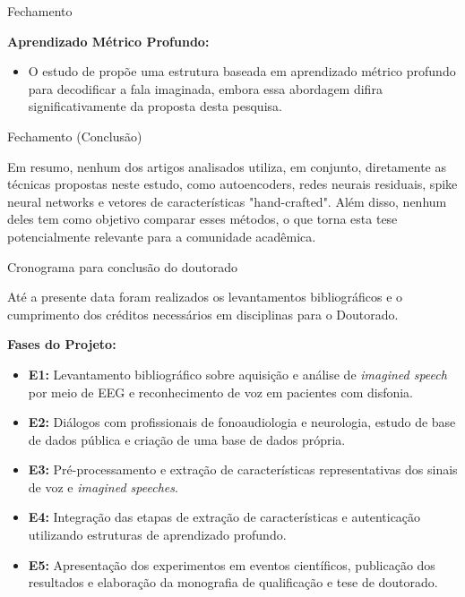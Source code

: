 \documentclass[aspectratio=169]{beamer}
\begin{document}
\begin{frame}[allowframebreaks]{Fechamento}
		\par \textbf{Aprendizado Métrico Profundo:}
		\begin{itemize}
			\item O estudo de \cite{lee2021decoding} propõe uma estrutura baseada em aprendizado métrico profundo para decodificar a fala imaginada, embora essa abordagem difira significativamente da proposta desta pesquisa.
		\end{itemize}
	\end{frame}
	\begin{frame}{Fechamento (Conclusão)}
		\par Em resumo, nenhum dos artigos analisados utiliza, em conjunto, diretamente as técnicas propostas neste estudo, como autoencoders, redes neurais residuais, spike neural networks e vetores de características "hand-crafted". Além disso, nenhum deles tem como objetivo comparar esses métodos, o que torna esta tese potencialmente relevante para a comunidade acadêmica.
	\end{frame}

	\begin{frame}{Cronograma para conclusão do doutorado}
			\par Até a presente data foram realizados os levantamentos bibliográficos e o cumprimento dos créditos necessários em disciplinas para o Doutorado.
			
			\par \textbf{Fases do Projeto:}
			
			\begin{itemize}
				\item \textbf{E1:} Levantamento bibliográfico sobre aquisição e análise de \textit{imagined speech} por meio de EEG e reconhecimento de voz em pacientes com disfonia.
				\item \textbf{E2:} Diálogos com profissionais de fonoaudiologia e neurologia, estudo de base de dados pública e criação de uma base de dados própria.
				\item \textbf{E3:} Pré-processamento e extração de características representativas dos sinais de voz e \textit{imagined speeches}.
				\item \textbf{E4:} Integração das etapas de extração de características e autenticação utilizando estruturas de aprendizado profundo.
				\item \textbf{E5:} Apresentação dos experimentos em eventos científicos, publicação dos resultados e elaboração da monografia de qualificação e tese de doutorado.
			\end{itemize}
	\end{frame}
\end{document}
